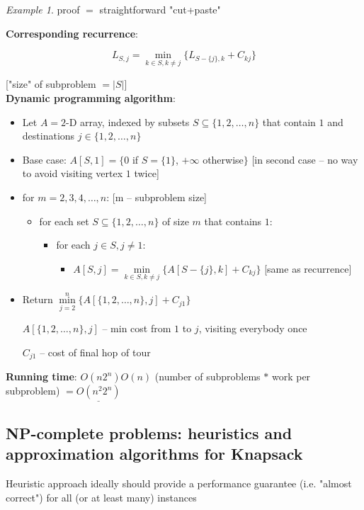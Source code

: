 \documentclass[a4paper,12pt]{article}
\theoremstyle{plain}
\theoremstyle{definition}
\theoremstyle{remark}
\newtheorem*{example}{Example}
\begin{document}
\begin{example} proof $=$ straightforward "cut+paste"\end{example}

\textbf{Corresponding recurrence}:

\[
L_{S,j} = \min\limits_{k \in S, k \neq j} \{ L_{S-\{j\},k} + C_{kj} \}
\]

["size" of subproblem $= |S|$]
\\

\textbf{Dynamic programming algorithm}:
\begin{itemize}
	\item Let $A = 2$-D array, indexed by subsets $S \subseteq \{1, 2, \dots, n\}$ that contain $1$ and destinations $j \in \{1, 2, \dots, n\}$
	\item Base case: $A[S,1] = \{0$ if $S=\{1\}$, $+\infty$ otherwise$\}$ [in second case -- no way to avoid visiting vertex $1$ twice]
	\item for $m = 2, 3, 4, \dots, n$: [m -- subproblem size]
	\begin{itemize}
		\item for each set $S \subseteq \{1, 2, \dots, n\}$ of size $m$ that contains $1$:
		\begin{itemize}
			\item for each $j \in S, j \neq 1$:
			\begin{itemize}
				\item $A[S,j] = \min\limits_{k \in S, k \neq j} \{ A[S-\{j\}, k] + C_{kj}\}$ [same as recurrence]
			\end{itemize}
		\end{itemize}
	\end{itemize}
	\item Return $\min\limits_{j = 2}^{n} \{ A[\{1, 2, \dots, n\}, j] + C_{j1} \}$

	$A[\{1, 2, \dots, n\}, j]$ -- min cost from $1$ to $j$, visiting everybody once

	$C_{j1}$ -- cost of final hop of tour
\end{itemize}

\textbf{Running time}: $O(n 2^n) O (n)$ (number of subproblems $*$ work per subproblem) $= \underline{O(n^2 2^n)}$



\subsection{NP-complete problems: heuristics and approximation algorithms for Knapsack}
Heuristic approach ideally should provide a performance guarantee (i.e. "almost correct") for all (or at least many) instances
\\
\end{document}
